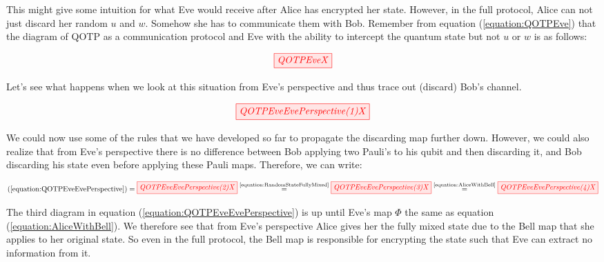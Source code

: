 \documentclass[]{article}
\newcommand{\equaltext}[1]{\ensuremath{\stackrel{\text{#1}}{=}}}
\begin{document}
This might give some intuition for what Eve would receive after Alice has encrypted her state. However, in the full protocol, Alice can not just discard her random $u$ and $w$. Somehow she has to communicate them with Bob. Remember from equation (\ref{equation:QOTPEve}) that the diagram of QOTP as a communication protocol and Eve with the ability to intercept the quantum state but not $u$ or $w$ is as follows:

\begin{equation}
	\tikzfig{QOTPEveX}
\end{equation}

Let's see what happens when we look at this situation from Eve's perspective and thus trace out (discard) Bob's channel.

\begin{equation}
	\label{equation:QOTPEveEvePerspective}
	\tikzfig{QOTPEveEvePerspective(1)X}
\end{equation}

We could now use some of the rules that we have developed so far to propagate the discarding map further down. However, we could also realize that from Eve's perspective there is no difference between Bob applying two Pauli's to his qubit and then discarding it, and Bob discarding his state even before applying these Pauli maps. Therefore, we can write: 

\begin{equation}
(\ref{equation:QOTPEveEvePerspective}) = 
\tikzfig{QOTPEveEvePerspective(2)X} \equaltext{\ref{equation:RandomStateFullyMixed}}
\tikzfig{QOTPEveEvePerspective(3)X} \equaltext{\ref{equation:AliceWithBell}}
\tikzfig{QOTPEveEvePerspective(4)X}
\end{equation}

The third diagram in equation (\ref{equation:QOTPEveEvePerspective}) is up until Eve's map $\Phi$ the same as equation (\ref{equation:AliceWithBell}). We therefore see that from Eve's perspective Alice gives her the fully mixed state due to the Bell map that she applies to her original state. So even in the full protocol, the Bell map is responsible for encrypting the state such that Eve can extract no information from it. 
\end{document}
